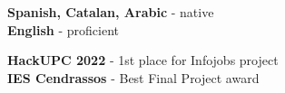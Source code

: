 \documentclass[9pt]{developercv} %
\begin{document}

\begin{minipage}[t]{0.45\textwidth} %
	\vspace{-\baselineskip} %

	
	\textbf{Spanish, Catalan, Arabic} - native\\
	\textbf{English} - proficient
\end{minipage}
\hfill %
\begin{minipage}[t]{0.45\textwidth} %
	\vspace{-\baselineskip} %
	
	
	\textbf{HackUPC 2022} - 1st place for Infojobs project\\
	\textbf{IES Cendrassos} - Best Final Project award
\end{minipage}

\end{document}
